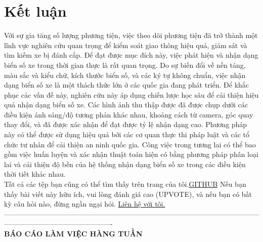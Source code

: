 \documentclass{article}
\begin{document}
\section{Kết luận}
Với sự gia tăng số lượng phương tiện, việc theo dõi phương tiện đã trở thành một lĩnh vực nghiên cứu quan trọng để kiểm soát giao thông hiệu quả, giám sát và tìm kiếm xe bị đánh cắp. Để đạt được mục đích này, việc phát hiện và nhận dạng biển số xe trong thời gian thực là rất quan trọng. Do sự biến đổi về nền tảng, màu sắc và kiểu chữ, kích thước biển số, và các ký tự không chuẩn, việc nhận dạng biển số xe là một thách thức lớn ở các quốc gia đang phát triển. Để khắc phục các vấn đề này, nghiên cứu này áp dụng chiến lược học sâu để cải thiện hiệu quả nhận dạng biển số xe. Các hình ảnh thu thập được đã được chụp dưới các điều kiện ánh sáng/độ tương phản khác nhau, khoảng cách từ camera, góc quay thay đổi, và đã được xác nhận để đạt được tỷ lệ nhận dạng cao. Phương pháp này có thể được sử dụng hiệu quả bởi các cơ quan thực thi pháp luật và các tổ chức tư nhân để cải thiện an ninh quốc gia. Công việc trong tương lai có thể bao gồm việc huấn luyện và xác nhận thuật toán hiện có bằng phương pháp phân loại lai và cải thiện độ bền của hệ thống nhận dạng biển số xe trong các điều kiện thời tiết khác nhau.
\\
Tất cả các tệp bạn cũng có thể tìm thấy trên trang của tôi.\href{https://github.com/Asikpalysik/Automatic-License-Plate-Detection}{GITHUB} 
Nếu bạn thấy bài viết này hữu ích, vui lòng đánh giá cao (UPVOTE), và nếu bạn có bất kỳ câu hỏi nào, đừng ngần ngại hỏi.
\href{http://aslanahmedov.com.}{Liên hệ với tôi.}
\newline
\\
----------------------------------------------------------------------------------------------------------------------------------------------------------\\
\textbf{BÁO CÁO LÀM VIỆC HÀNG TUẦN}
\end{document}

